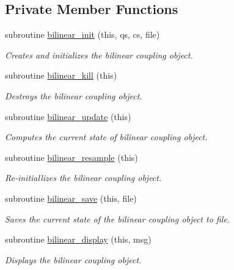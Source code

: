 \subsection*{Private Member Functions}
\begin{DoxyCompactItemize}
\item 
subroutine \hyperlink{classbilinear__class_a767f35cd3ebd5ef00f6a55fd775c3a27}{bilinear\+\_\+init} (this, qs, cs, file)
\begin{DoxyCompactList}\small\item\em Creates and initializes the bilinear coupling object. \end{DoxyCompactList}\item 
subroutine \hyperlink{classbilinear__class_ae206ab58d224c9a0b7e25ac038e003ae}{bilinear\+\_\+kill} (this)
\begin{DoxyCompactList}\small\item\em Destroys the bilinear coupling object. \end{DoxyCompactList}\item 
subroutine \hyperlink{classbilinear__class_a37ead815723c4c247c156200f5bf4721}{bilinear\+\_\+update} (this)
\begin{DoxyCompactList}\small\item\em Computes the current state of bilinear coupling object. \end{DoxyCompactList}\item 
subroutine \hyperlink{classbilinear__class_aac587f5ea6d66ee89ff3210b10569777}{bilinear\+\_\+resample} (this)
\begin{DoxyCompactList}\small\item\em Re-\/initiallizes the bilinear coupling object. \end{DoxyCompactList}\item 
subroutine \hyperlink{classbilinear__class_a5fe875f5d4db31ef7a7e721ba4a0146a}{bilinear\+\_\+save} (this, file)
\begin{DoxyCompactList}\small\item\em Saves the current state of the bilinear coupling object to file. \end{DoxyCompactList}\item 
subroutine \hyperlink{classbilinear__class_a4346246df7738e0d609716d961a3b94c}{bilinear\+\_\+display} (this, msg)
\begin{DoxyCompactList}\small\item\em Displays the bilinear coupling object. \end{DoxyCompactList}\item 

\end{DoxyCompactItemize}
